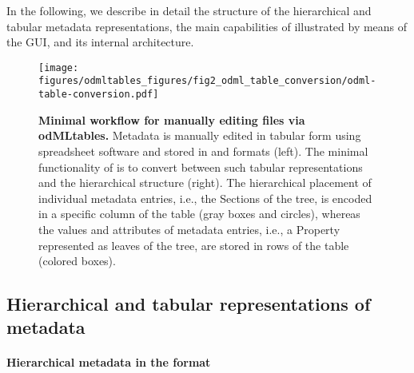 In the following, we describe in detail the structure of the hierarchical and tabular metadata representations, the main capabilities of  illustrated by means of the GUI, and its internal architecture. 


\begin{figure}[!ht]
\begin{center}
\texttt{[image: figures/odmltables\_figures/fig2\_odml\_table\_conversion/odml-table-conversion.pdf]}
\caption[Minimal workflow for manually editing  files via odMLtables]{{\label{fig:min_workflow}
\textbf{Minimal workflow for manually editing  files via odMLtables.} Metadata is manually edited in tabular form using spreadsheet software and stored in  and  formats (left). The minimal functionality of  is to convert between such tabular representations and the hierarchical  structure (right). The hierarchical placement of individual metadata entries, i.e., the Sections of the  tree, is encoded in a specific column of the table (gray boxes and circles), whereas the values and attributes of metadata entries, i.e., a Property represented as leaves of the  tree, are stored in rows of the table (colored boxes).%
}}
\end{center}
\end{figure}

\subsection{Hierarchical and tabular representations of metadata}
\label{sec:Hierarchical-Tabular}

\paragraph{Hierarchical metadata in the  format}
\label{sec:subodML}

